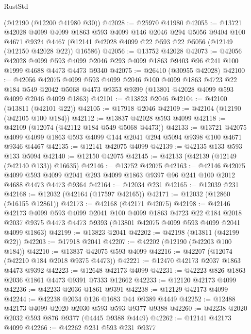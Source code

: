 \begin{lexlean}{RustStd}
\begin{coremodule}
    (@12190 (@12200 @41980 @30))
@42028 := @25970 @41980
@42055 := @13721
    @42028
    @4099
    @4099
    @1863
    @593
    @4099
    @146
    @2046
    @294
    @5056
    @9404
    @100
    @4671
    @9324
    @4467
    (@12141 @42028 @4099 @22 @593 @22 @5056 (@12149 (@12150 @42028 @22)) @16586)
@42056 := @13752 @42028
@42073 := @42056
    @42028
    @4099
    @593
    @4099
    @2046
    @293
    @4099
    @1863
    @9403
    @96
    @241
    @100
    @1999
    @4688
    @4473
    @4473
    @9340
@42075 := @26410 (@30955 @42028)
@42100 := @42056
    @42075
    @4099
    @593
    @4099
    @2046
    @100
    @4099
    @1863
    @4723
    @22
    @184
    @549
    @2042
    @5068
    @4473
    @9353
    @9399
    (@13801 @42028 @4099 @593 @4099 @2046 @4099 @1863)
@42101 := @13823 @2046
@42104 := @42100 (@13811 (@42101 @22))
@42105 := @17918 @2046
@42109 := @42104 (@12190 (@42105 @100 @184))
@42112 := @13837 @42028 @593 @4099
@42118 := @42109 (@12074 (@42112 @184 @549 @5068 @4473))
@42133 := @13721
    @42075
    @4099
    @4099
    @1863
    @593
    @4099
    @144
    @2041
    @294
    @5094
    @9398
    @100
    @4671
    @9346
    @4467
@42135 := @12141 @42075 @4099
@42139 := @42135 @133 @593 @133 @5094
@42140 := @12150 @42075
@42145 := @42133 (@42139 (@12149 (@42140 @133)) @16635)
@42146 := @13752 @42075
@42163 := @42146
    @42075
    @4099
    @593
    @4099
    @2041
    @293
    @4099
    @1863
    @9397
    @96
    @241
    @100
    @2012
    @4688
    @4473
    @4473
    @9364
@42164 := @12034 @231
@42165 := @12039 @231
@42168 := @12032 (@42164 (@17597 @42165))
@42171 := @12032 (@12860 (@16155 @12861))
@42173 := @42168 (@42171 @42075)
@42198 := @42146
    @42173
    @4099
    @593
    @4099
    @2041
    @100
    @4099
    @1863
    @4723
    @22
    @184
    @2018
    @2037
    @9375
    @4473
    @4473
    @9393
    (@13801 @42075 @4099 @593 @4099 @2041 @4099 @1863)
@42199 := @13823 @2041
@42202 := @42198 (@13811 (@42199 @22))
@42203 := @17918 @2041
@42207 := @42202 (@12190 (@42203 @100 @184))
@42210 := @13837 @42075 @593 @4099
@42216 := @42207 (@12074 (@42210 @184 @2018 @9375 @4473))
@42221 := @12470 @42173 @2037 @1863 @4473 @9392
@42223 := @12648 @42173 @4099
@42231 := @42223 @826 @1863 @2036 @1861 @4473 @9391 @7333 @12662
@42233 := @12120 @42173 @4099
@42236 := @42233 @2036 @1861 @9391
@42238 := @12129 @42173 @4099
@42244 := @42238 @2034 @126 @1683 @44 @9389 @4449
@42252 := @12488 @42173 @4099 @2020 @2030 @593 @593 @9377 @9388
@42260 := @42238 @2020 @2032 @593 @876 @9377 (@4445 @9388 @4449)
@42262 := @12141 @42173 @4099
@42266 := @42262 @231 @593 @231 @9377

\end{coremodule}
\end{lexlean}
